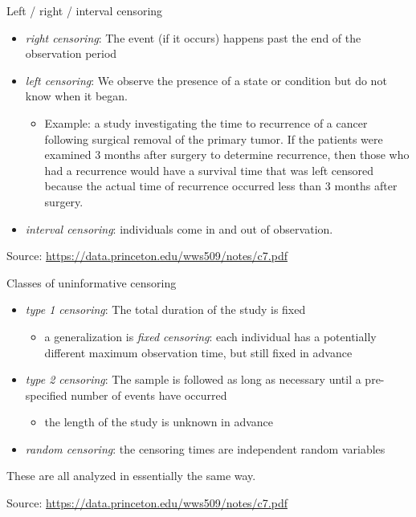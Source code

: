 \documentclass[
  ignorenonframetext,
]{beamer}
\providecommand{\tightlist}{%
  \setlength{\itemsep}{0pt}\setlength{\parskip}{0pt}}
\begin{document}
\begin{frame}{Left / right / interval censoring}
\protect\hypertarget{left-right-interval-censoring}{}

\begin{itemize}
\tightlist
\item
  \emph{right censoring}: The event (if it occurs) happens past the end
  of the observation period
\item
  \emph{left censoring}: We observe the presence of a state or condition
  but do not know when it began.

  \begin{itemize}
  \tightlist
  \item
    Example: a study investigating the time to recurrence of a cancer
    following surgical removal of the primary tumor. If the patients
    were examined 3 months after surgery to determine recurrence, then
    those who had a recurrence would have a survival time that was left
    censored because the actual time of recurrence occurred less than 3
    months after surgery.
  \end{itemize}
\item
  \emph{interval censoring}: individuals come in and out of observation.
\end{itemize}

\footnotesize Source:
\url{https://data.princeton.edu/wws509/notes/c7.pdf}

\end{frame}

\begin{frame}{Classes of uninformative censoring}
\protect\hypertarget{classes-of-uninformative-censoring}{}

\begin{itemize}
\tightlist
\item
  \emph{type 1 censoring}: The total duration of the study is fixed

  \begin{itemize}
  \tightlist
  \item
    a generalization is \emph{fixed censoring}: each individual has a
    potentially different maximum observation time, but still fixed in
    advance
  \end{itemize}
\item
  \emph{type 2 censoring}: The sample is followed as long as necessary
  until a pre-specified number of events have occurred

  \begin{itemize}
  \tightlist
  \item
    the length of the study is unknown in advance
  \end{itemize}
\item
  \emph{random censoring}: the censoring times are independent random
  variables
\end{itemize}

These are all analyzed in essentially the same way.

\footnotesize Source:
\url{https://data.princeton.edu/wws509/notes/c7.pdf}

\end{frame}
\end{document}
